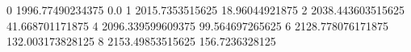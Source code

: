 0 1996.77490234375 0.0
1 2015.7353515625 18.96044921875
2 2038.443603515625 41.668701171875
4 2096.339599609375 99.564697265625
6 2128.778076171875 132.003173828125
8 2153.49853515625 156.7236328125
